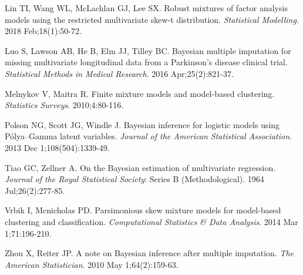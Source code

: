 \documentclass[useAMS,referee]{biom}
\begin{document}
\begin{thebibliography}{}
\bibitem{ } Lin TI, Wang WL, McLachlan GJ, Lee SX. Robust mixtures of factor analysis models using the restricted multivariate skew-t distribution. \textit{Statistical Modelling}. 2018 Feb;18(1):50-72.

\bibitem{ } Luo S, Lawson AB, He B, Elm JJ, Tilley BC. Bayesian multiple imputation for missing multivariate longitudinal data from a Parkinson's disease clinical trial. \textit{Statistical Methods in Medical Research}. 2016 Apr;25(2):821-37.

\bibitem{ } Melnykov V, Maitra R. Finite mixture models and model-based clustering. \textit{Statistics Surveys}. 2010;4:80-116.

\bibitem{ } Polson NG, Scott JG, Windle J. Bayesian inference for logistic models using P\'olya--Gamma latent variables. \textit{Journal of the American Statistical Association}. 2013 Dec 1;108(504):1339-49.

\bibitem{ } Tiao GC, Zellner A. On the Bayesian estimation of multivariate regression. \textit{Journal of the Royal Statistical Society}: Series B (Methodological). 1964 Jul;26(2):277-85.

\bibitem{ } Vrbik I, Mcnicholas PD. Parsimonious skew mixture models for model-based clustering and classification. \textit{Computational Statistics \& Data Analysis}. 2014 Mar 1;71:196-210.

\bibitem{ } Zhou X, Reiter JP. A note on Bayesian inference after multiple imputation. \textit{The American Statistician}. 2010 May 1;64(2):159-63.

\end{thebibliography}




\label{lastpage}
\end{document}
